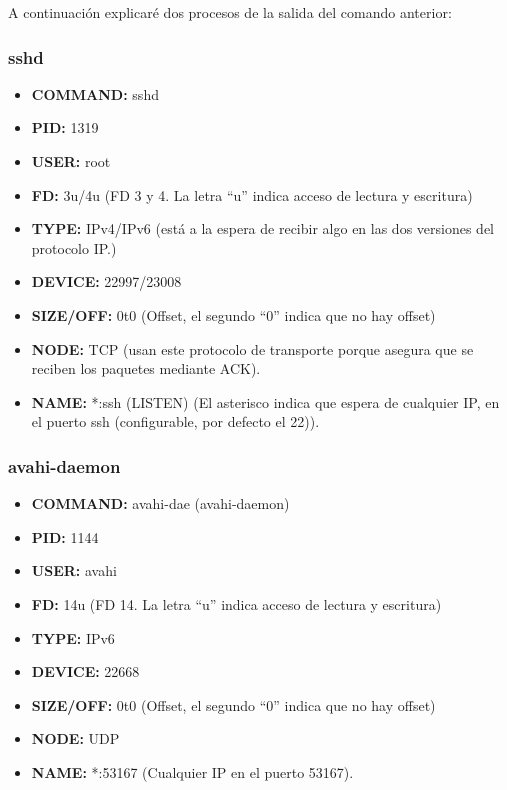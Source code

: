 \documentclass{article}
\begin{document}
A continuación explicaré dos procesos de la salida del comando anterior:

\subsubsection*{sshd}
\begin{itemize}
    \item \textbf{COMMAND: }sshd
    \item \textbf{PID: }1319
    \item \textbf{USER: }root
    \item \textbf{FD: }3u/4u (FD 3 y 4. La letra ``u'' indica acceso de lectura y escritura)
    \item \textbf{TYPE: }IPv4/IPv6 (está a la espera de recibir algo en las dos versiones del protocolo IP.)
    \item \textbf{DEVICE: }22997/23008
    \item \textbf{SIZE/OFF: }0t0 (Offset, el segundo ``0'' indica que no hay offset)
    \item \textbf{NODE: }TCP (usan este protocolo de transporte porque asegura que se reciben los paquetes mediante ACK).
    \item \textbf{NAME: }*:ssh (LISTEN) (El asterisco indica que espera de cualquier IP, en el puerto ssh (configurable, por defecto el 22)).
\end{itemize}

\subsubsection*{avahi-daemon}
\begin{itemize}
    \item \textbf{COMMAND: }avahi-dae (avahi-daemon)
    \item \textbf{PID: }1144
    \item \textbf{USER: }avahi
    \item \textbf{FD: }14u (FD 14. La letra ``u'' indica acceso de lectura y escritura)
    \item \textbf{TYPE: }IPv6
    \item \textbf{DEVICE: }22668
    \item \textbf{SIZE/OFF: }0t0 (Offset, el segundo ``0'' indica que no hay offset)
    \item \textbf{NODE: }UDP
    \item \textbf{NAME: }*:53167 (Cualquier IP en el puerto 53167).
\end{itemize}
\end{document}
